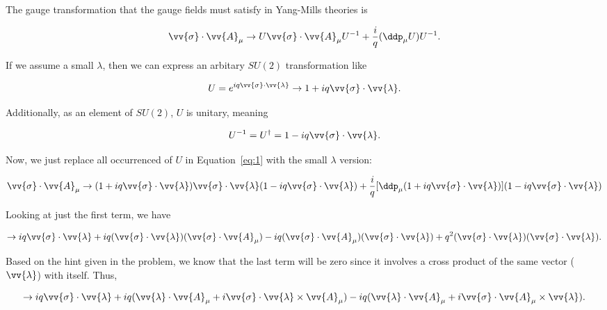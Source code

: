 \section{}

The gauge transformation that the gauge fields must satisfy in Yang-Mills theories is

\begin{equation}
  \label{eq:1}
  \vv{\sigma}\cdot\vv{A}_{\mu} \rightarrow U\vv{\sigma}\cdot\vv{A}_{\mu}U^{-1} + \frac{i}{q} (\ddp_{\mu}U) U^{-1}.
\end{equation}

If we assume a small $\lambda$, then we can express an arbitary $SU(2)$ transformation like

\begin{equation}
  U = e^{iq\vv{\sigma}\cdot\vv{\lambda}} \rightarrow 1 + iq\vv{\sigma}\cdot\vv{\lambda}.
\end{equation}

Additionally, as an element of $SU(2)$, $U$ is unitary, meaning

\begin{equation}
  U^{-1} = U^{\dagger} = 1 - iq\vv{\sigma}\cdot\vv{\lambda}.
\end{equation}

Now, we just replace all occurrenced of $U$ in Equation~\eqref{eq:1} with the small $\lambda$ version:

\begin{equation}
  \vv{\sigma}\cdot{\vv{A}_{\mu}} \rightarrow (1 + iq\vv{\sigma}\cdot\vv{\lambda}) \vv{\sigma}\cdot\vv{\lambda} (1 - iq\vv{\sigma}\cdot\vv{\lambda}) + \frac{i}{q}[\ddp_{\mu}(1 + iq\vv{\sigma}\cdot\vv{\lambda})](1 -iq\vv{\sigma}\cdot\vv{\lambda})
\end{equation}

Looking at just the first term, we have

\begin{equation}
  \rightarrow iq\vv{\sigma}\cdot\vv{\lambda} + iq(\vv{\sigma}\cdot\vv{\lambda})(\vv{\sigma}\cdot\vv{A}_{\mu}) -iq(\vv{\sigma}\cdot\vv{A}_{\mu})(\vv{\sigma}\cdot\vv{\lambda}) + q^2(\vv{\sigma}\cdot\vv{\lambda})(\vv{\sigma}\cdot\vv{\lambda}).
\end{equation}

Based on the hint given in the problem, we know that the last term will be zero since it involves a cross product of the same vector ($\vv{\lambda}$) with itself. Thus,

\begin{equation}
  \rightarrow iq\vv{\sigma}\cdot\vv{\lambda} + iq(\vv{\lambda}\cdot\vv{A}_{\mu} + i\vv{\sigma}\cdot\vv{\lambda}\times\vv{A}_{\mu}) -iq(\vv{\lambda}\cdot\vv{A}_{\mu} + i\vv{\sigma}\cdot\vv{A}_{\mu}\times\vv{\lambda}).
\end{equation}

